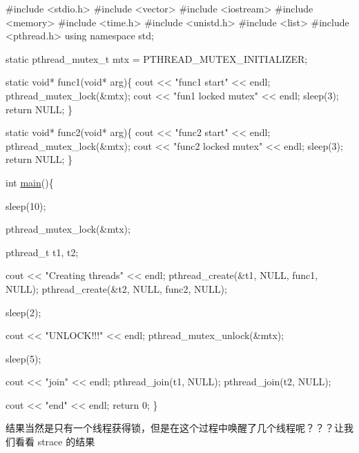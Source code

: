 \begin{DoxyCode}
\textcolor{preprocessor}{#include <stdio.h>}
\textcolor{preprocessor}{#include <vector>}
\textcolor{preprocessor}{#include <iostream>}
\textcolor{preprocessor}{#include <memory>}
\textcolor{preprocessor}{#include <time.h>}
\textcolor{preprocessor}{#include <unistd.h>}
\textcolor{preprocessor}{#include <list>}
\textcolor{preprocessor}{#include <pthread.h>}
\textcolor{keyword}{using namespace }std;

\textcolor{keyword}{static} pthread\_mutex\_t mtx = PTHREAD\_MUTEX\_INITIALIZER;

\textcolor{keyword}{static} \textcolor{keywordtype}{void}* func1(\textcolor{keywordtype}{void}* arg)\{
    cout << \textcolor{stringliteral}{"func1 start"} << endl;
    pthread\_mutex\_lock(&mtx);
    cout << \textcolor{stringliteral}{"fun1 locked mutex"} << endl;
    sleep(3);
    \textcolor{keywordflow}{return} NULL;
\}

\textcolor{keyword}{static} \textcolor{keywordtype}{void}* func2(\textcolor{keywordtype}{void}* arg)\{
    cout << \textcolor{stringliteral}{"func2 start"} << endl;
    pthread\_mutex\_lock(&mtx);
    cout << \textcolor{stringliteral}{"func2 locked mutex"} << endl;
    sleep(3);
    \textcolor{keywordflow}{return} NULL;
\}

\textcolor{keywordtype}{int} \hyperlink{main_8cpp_a0ddf1224851353fc92bfbff6f499fa97}{main}()\{

    sleep(10);

    pthread\_mutex\_lock(&mtx);

    pthread\_t t1, t2;

    cout << \textcolor{stringliteral}{"Creating threads"} << endl;
    pthread\_create(&t1, NULL, func1, NULL);
    pthread\_create(&t2, NULL, func2, NULL);

    sleep(2);

    cout << \textcolor{stringliteral}{"UNLOCK!!!"} << endl;
    pthread\_mutex\_unlock(&mtx);

    sleep(5);

    cout << \textcolor{stringliteral}{"join"} << endl;
    pthread\_join(t1, NULL);
    pthread\_join(t2, NULL);

    cout << \textcolor{stringliteral}{"end"} << endl;
    \textcolor{keywordflow}{return} 0;
\}
\end{DoxyCode}


结果当然是只有一个线程获得锁，但是在这个过程中唤醒了几个线程呢？？？让我们看看 strace 的结果


